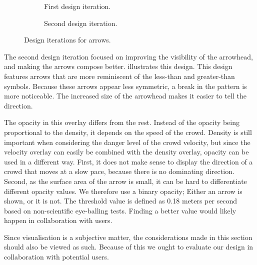 \begin{figure}[htbp]
\begin{subfigure}[c]{.49\linewidth}
    \centering
    \caption{First design iteration.}
    \label{fig:first_arrow_design}
\end{subfigure}
%
\begin{subfigure}[c]{.49\linewidth}
    \centering
    \caption{Second design iteration.}
    \label{fig:second_arrow_design}
\end{subfigure}
\caption{Design iterations for arrows.}
\end{figure}



The second design iteration focused on improving the visibility of the arrowhead, and making the arrows compose better.  illustrates this design. This design features arrows that are more reminiscent of the less-than and greater-than symbols. Because these arrows appear less symmetric, a break in the pattern is more noticeable. The  increased size of the arrowhead makes it easier to tell the direction.

The opacity in this overlay differs from the rest. Instead of the opacity being proportional to the density, it depends on the speed of the crowd. Density is still important when considering the danger level of the crowd velocity, but since the velocity overlay can easily be combined with the density overlay, opacity can be used in a different way. First, it does not make sense to display the direction of a crowd that moves at a slow pace, because there is no dominating direction. Second, as the surface area of the arrow is small, it can be hard to differentiate different opacity values. We therefore use a binary opacity; Either an arrow is shown, or it is not. The threshold value is defined as 0.18 meters per second based on non-scientific eye-balling tests. Finding a better value would likely happen in collaboration with users.

Since visualisation is a subjective matter, the considerations made in this section should also be viewed as such. Because of this we ought to evaluate our design in collaboration with potential users.